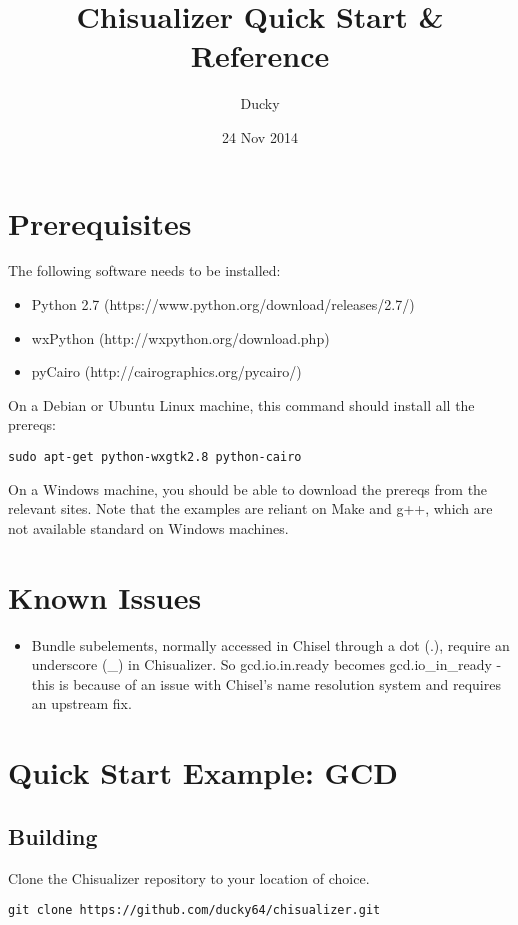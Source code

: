 \documentclass[11pt]{article}
\title{\textbf{Chisualizer Quick Start \& Reference}}
\author{Ducky}
\date{24 Nov 2014}
\begin{document}
\maketitle

\section{Prerequisites}
The following software needs to be installed:
\begin{itemize}
  \item Python 2.7 (https://www.python.org/download/releases/2.7/)
  \item wxPython (http://wxpython.org/download.php)
  \item pyCairo (http://cairographics.org/pycairo/)
\end{itemize}

On a Debian or Ubuntu Linux machine, this command should install all the prereqs:
\begin{verbatim}
sudo apt-get python-wxgtk2.8 python-cairo
\end{verbatim}

On a Windows machine, you should be able to download the prereqs from the relevant sites. Note that the examples are reliant on Make and g++, which are not available standard on Windows machines.

\section{Known Issues}
\begin{itemize}
  \item Bundle subelements, normally accessed in Chisel through a dot (.), require an underscore (\_) in Chisualizer. So gcd.io.in.ready becomes gcd.io\_in\_ready - this is because of an issue with Chisel's name resolution system and requires an upstream fix.
\end{itemize}

\section{Quick Start Example: GCD}
\subsection{Building}
Clone the Chisualizer repository to your location of choice.
\begin{verbatim}
git clone https://github.com/ducky64/chisualizer.git
\end{verbatim}
\end{document}
